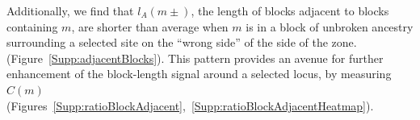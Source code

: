 \documentclass[11pt,letterpaper]{article}
\newcommand{\plr}[1]{{\em \color{blue} #1}}
\begin{document}
Additionally, we find that $l_A(m\pm)$, the length of blocks adjacent to blocks containing $m$, are shorter than average when $m$ is in a block of unbroken ancestry surrounding a selected site on the ``wrong side'' of the side of the zone.  (Figure~\ref{Supp:adjacentBlocks}). This pattern provides an avenue for further enhancement of the block-length signal around a selected locus, by measuring $C(m)$  (Figures~\ref{Supp:ratioBlockAdjacent},~\ref{Supp:ratioBlockAdjacentHeatmap}).












\end{document}
